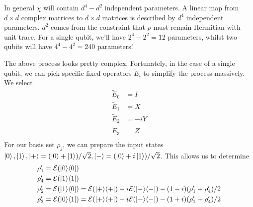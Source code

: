In general $\chi$ will contain $d^4 - d^2$ independent parameters. A linear map from $d \times d$
complex matrices to $d \times d$ matrices is described by $d^4$ independent parameters. $d^2$ comes
from the constraint that $\rho$ must remain Hermitian with unit trace. For a single qubit, we'll
have $2^4 - 2^2 = 12$ parameters, whilst two qubits will have $4^4 - 4^2 = 240$ parameters!  

The above process looks pretty complex. Fortunately, in the case of a single qubit, we can pick
specific fixed operators $\tilde{E}_i$ to simplify the process massively. We select
\begin{align}
    \tilde{E}_0 &= I \\
    \tilde{E}_1 &= X \\
    \tilde{E}_2 &= -iY \\
    \tilde{E}_3 &= Z \\
\end{align}
For our basis set $\rho_j$, we can prepare the input states $\ket{0}, \ket{1}, \ket{+} = (\ket{0} +
\ket{1}) / \sqrt{2}, \ket{-}= (\ket{0} + i\ket{1}) / \sqrt{2}$. This allows us to determine
\begin{align}
    \rho_1' &= \mathcal{E}(\ketbra{0}{0}) \\
    \rho_4' &= \mathcal{E}(\ketbra{1}{1}) \\
    \rho_2' &= \mathcal{E}(\ketbra{1}{0}) = \mathcal{E}(\ketbra{+}{+}) - i\mathcal{E}(\ketbra{-}{-}) - (1 - i)(\rho_1' + \rho_4') / 2 \\
    \rho_3' &= \mathcal{E}(\ketbra{0}{1}) = \mathcal{E}(\ketbra{+}{+}) + i\mathcal{E}(\ketbra{-}{-}) - (1 + i)(\rho_1' + \rho_4') / 2
\end{align}
